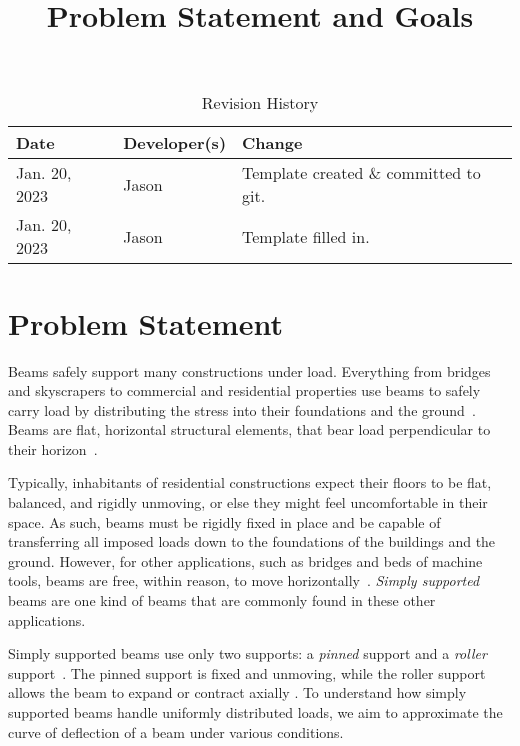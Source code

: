 \documentclass{article}
\title{Problem Statement and Goals\\\progname{}}
\author{\authname}
\date{}
\begin{document}
\maketitle

\begin{table}[hp]
    \caption{Revision History} \label{TblRevisionHistory}
    \begin{tabularx}{\textwidth}{llX}
        \toprule
        \textbf{Date} & \textbf{Developer(s)} & \textbf{Change}                  \\
        \midrule
        Jan. 20, 2023 & Jason                 & Template created \& committed to
        git.
        \\
        Jan. 20, 2023 & Jason                 & Template filled in.              \\
        \bottomrule
    \end{tabularx}
\end{table}

\section{Problem Statement}
\label{problem-statement}

Beams safely support many constructions under load. Everything from bridges and
skyscrapers to commercial and residential properties use beams to safely carry
load by distributing the stress into their foundations and the ground\
\cite{Moscovitch2020}. Beams are flat, horizontal structural elements, that bear
load perpendicular to their horizon\ \cite{Moscovitch2020}.

Typically, inhabitants of residential constructions expect their floors to be
flat, balanced, and rigidly unmoving, or else they might feel uncomfortable in
their space. As such, beams must be rigidly fixed in place and be capable of
transferring all imposed loads down to the foundations of the buildings and the
ground. However, for other applications, such as bridges and beds of machine
tools, beams are free, within reason, to move horizontally\
\cite{BirdChivers1993}. \textit{Simply supported} beams are one kind of beams
that are commonly found in these other applications.

Simply supported beams use only two supports: a \textit{pinned} support and a
\textit{roller} support\ \cite{Lemonis2022}. The pinned support is fixed and
unmoving, while the roller support allows the beam to expand or contract axially
\cite{Lemonis2022}. To understand how simply supported beams handle uniformly
distributed loads, we aim to approximate the curve of deflection of a beam under
various conditions.
\end{document}
